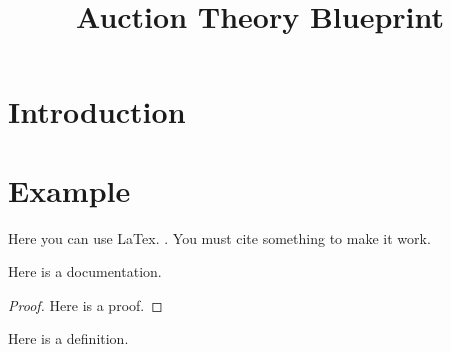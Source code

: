 \title{Auction Theory Blueprint} 




\maketitle


\tableofcontents
\section{Introduction}



\section{Example}
Here you can use LaTex. \cite{marcus}. You must cite something to make it work.

\begin{lemma}\label{two_different_elements}
    \leanok
    Here is a documentation.
\end{lemma}

\begin{proof}
    Here is a proof.
\end{proof}

\begin{definition}\label{Auction}
    \leanok
    Here is a definition.
\end{definition}





